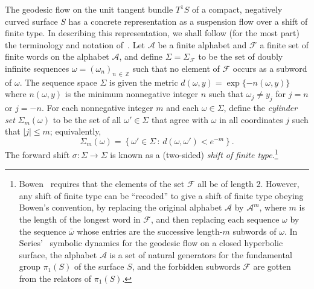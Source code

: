 \documentclass[AHL, Unicode, longabstracts, published]{cedram}
\newcommand{\xset}[1]{\left\{ #1 \right\}}
\newcommand{\zz}[1]{\mathbb #1}
\begin{document}
The geodesic flow on the unit tangent bundle $T^1S$ of a compact, negatively curved surface $S$ has a concrete representation as a suspension flow over a shift of finite type. In describing this representation, we shall follow (for the most part) the terminology and notation of~\cite{bowen:book,lalley:duke,series:symbDynFlows}. Let $\mathcal{A}$ be a finite alphabet and $\mathcal{F}$ a finite set of finite words on the alphabet $\mathcal{A}$, and define $\Sigma =\Sigma_{\mathcal{F}}$ to be the set of doubly infinite sequences $\omega = (\omega_{n})_{n\,\in\, \zz{Z}}$ such that no element of $\mathcal{F}$ occurs as a subword of $\omega$. The sequence space $\Sigma $ is given the metric $d (\omega,y)=\exp \{-n (\omega,y) \}$ where $n (\omega,y)$ is the minimum nonnegative integer $n$ such that $\omega_{j}\not =y_{j}$ for $j= n$ or $j=-n$. For each nonnegative integer $m$ and each $\omega \in \Sigma$, define the \emph{cylinder set} $\Sigma_{m}(\omega) $ to be the set of all $\omega'\in\Sigma$ that agree with $\omega$ in all coordinates $j$ such that $|j| \leq m$; equivalently,
\begin{equation}\label{eq:cylinder}
\Sigma_{m}(\omega)= \xset {\omega' \in \Sigma \,:\, d(\omega,\omega')< e^{-m}}.
\end{equation}
The forward shift $\sigma :\Sigma \rightarrow \Sigma$ is known as a (two-sided) \emph{shift of finite type}.\footnote{Bowen~\cite{bowen:book} requires that the elements of the set $\mathcal{F}$ all be of length 2. However, any shift of finite type can be ``recoded'' to give a shift of finite type obeying Bowen's convention, by replacing the original alphabet $\mathcal{A}$ by $\mathcal{A}^{m}$, where $m$ is the length of the longest word in $\mathcal{F}$, and then replacing each sequence $\omega $ by the sequence $\bar{\omega}$ whose entries are the successive length-$m$ subwords of $\omega$. In Series'~\cite{series:symbDynFlows} symbolic dynamics for the geodesic flow on a closed hyperbolic surface, the alphabet $\mathcal{A}$ is a set of natural generators for the fundamental group $\pi_{1} (S)$ of the surface $S$, and the forbidden subwords $\mathcal{F}$ are gotten from the relators of $\pi_{1} (S)$.}
\end{document}
